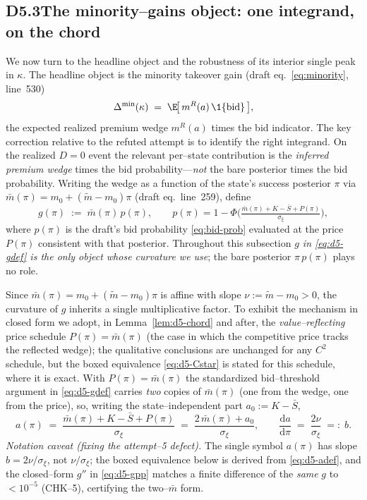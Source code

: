 \subsection*{D5.3\quad The minority--gains object: one integrand, on the chord}

We now turn to the headline object and the robustness of its interior single
peak in $\kappa$. The headline object is the minority takeover gain (draft
eq.~\eqref{eq:minority}, line~530)
\[
  \Delta^{\min}(\kappa)\;=\;\E\!\big[\,m^{R}(a)\,\1\{\textup{bid}\}\,\big],
\]
the expected realized premium wedge $m^{R}(a)$ times the bid indicator. The key
correction relative to the refuted attempt is to identify the right integrand.
On the realized $D=0$ event the relevant per--state contribution is the
\emph{inferred premium wedge} times the bid probability---\emph{not} the bare
posterior times the bid probability. Writing the wedge as a function of the
state's success posterior $\pi$ via $\bar{m}(\pi)=m_0+(\tilde{m}-m_0)\pi$
(draft eq.~line~259), define
\begin{equation}\label{eq:d5-gdef}
  g(\pi)\;:=\;\bar{m}(\pi)\,p(\pi),\qquad
  p(\pi)=1-\Phi\!\Big(\tfrac{\bar{m}(\pi)+K-\bar{S}+P(\pi)}{\sigma_\xi}\Big),
\end{equation}
where $p(\pi)$ is the draft's bid probability \eqref{eq:bid-prob} evaluated at
the price $P(\pi)$ consistent with that posterior. Throughout this subsection
\emph{$g$ in \eqref{eq:d5-gdef} is the only object whose curvature we use}; the
bare posterior $\pi\,p(\pi)$ plays no role.

\begin{remark}
\label{rem:d5-affine}
Since $\bar m(\pi)=m_0+(\tilde m-m_0)\pi$ is affine with slope
$\nu:=\tilde m-m_0>0$, the curvature of $g$ inherits a single multiplicative
factor. To exhibit the mechanism in closed form we adopt, in
Lemma~\ref{lem:d5-chord} and after, the \emph{value--reflecting} price schedule
$P(\pi)=\bar m(\pi)$ (the case in which the competitive price tracks the
reflected wedge); the qualitative conclusions are unchanged for any $C^2$
schedule, but the boxed equivalence \eqref{eq:d5-Cstar} is stated for this
schedule, where it is exact. With $P(\pi)=\bar m(\pi)$ the standardized
bid--threshold argument in \eqref{eq:d5-gdef} carries \emph{two} copies of
$\bar m(\pi)$ (one from the wedge, one from the price), so, writing the
state--independent part $a_0:=K-\bar S$,
\begin{equation}\label{eq:d5-adef}
  a(\pi)\;=\;\frac{\bar m(\pi)+K-\bar S+P(\pi)}{\sigma_\xi}
          \;=\;\frac{2\,\bar m(\pi)+a_0}{\sigma_\xi},
  \qquad
  \frac{\mathrm d a}{\mathrm d\pi}\;=\;\frac{2\nu}{\sigma_\xi}\;=:\;b.
\end{equation}
\emph{Notation caveat (fixing the attempt--5 defect).} The single symbol
$a(\pi)$ has slope $b=2\nu/\sigma_\xi$, not $\nu/\sigma_\xi$; the boxed
equivalence below is derived from \eqref{eq:d5-adef}, and the closed--form
$g''$ in \eqref{eq:d5-gpp} matches a finite difference of the \emph{same} $g$
to $<10^{-5}$ (CHK--5), certifying the two--$\bar m$ form. %
\end{remark}

